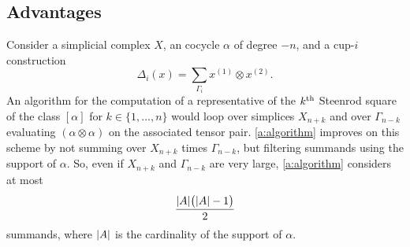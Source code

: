 \subsection{Advantages}

Consider a simplicial complex $X$, an cocycle $\alpha$ of degree $-n$, and a cup-$i$ construction
\[
\Delta_i(x) =
\sum_{\Gamma_i} x^{(1)} \otimes x^{(2)}.
\]
An algorithm for the computation of a representative of the $k^{\mathrm{th}}$ Steenrod square of the class $[\alpha]$ for $k \in \{1, \dots, n\}$ would loop over simplices $X_{n+k}$ and over $\Gamma_{n-k}$ evaluating $(\alpha \otimes \alpha)$ on the associated tensor pair.
\cref{a:algorithm} improves on this scheme by not summing over $X_{n+k}$ times $\Gamma_{n-k}$, but filtering summands using the support of $\alpha$.
So, even if $X_{n+k}$ and $\Gamma_{n-k}$ are very large, \cref{a:algorithm} considers at most
\[
\frac{\lvert A\rvert \big( \lvert A\rvert-1 \big)}{2}
\]
summands, where $\lvert A\rvert$ is the cardinality of the support of $\alpha$.